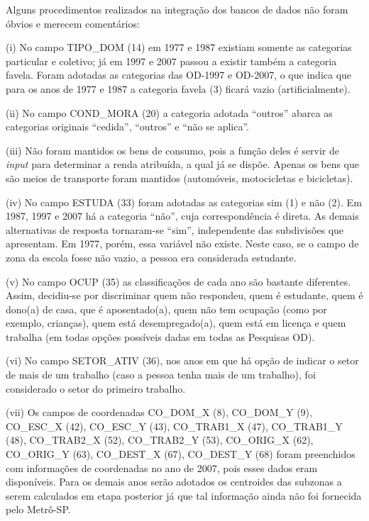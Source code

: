 Alguns procedimentos realizados na integração dos bancos de dados não foram óbvios e merecem comentários:
\begin{compactitem}[]
\item(i) No campo TIPO_DOM (14) em 1977 e 1987 existiam somente as categorias particular e coletivo; já em 1997 e 2007 passou a existir também a categoria favela. Foram adotadas as categorias das OD-1997 e OD-2007, o que indica que para os anos de 1977 e 1987 a categoria favela (3) ficará vazio (artificialmente).
\item(ii) No campo COND_MORA (20) a categoria adotada ``outros'' abarca as categorias originais ``cedida'', ``outros'' e ``não se aplica''.
\item(iii) Não foram mantidos os bens de consumo, pois a função deles é servir de \emph{input} para determinar a renda atribuída, a qual já se dispõe. Apenas os bens que são meios de transporte foram mantidos (automóveis, motocicletas e bicicletas).
\item (iv) No campo ESTUDA (33) foram adotadas as categorias sim (1) e não (2). Em 1987, 1997 e 2007 há a categoria ``não'', cuja correspondência é direta. As demais alternativas de resposta tornaram-se ``sim'', independente das subdivisões que apresentam. Em 1977, porém, essa variável não existe. Neste caso, se o campo de zona da escola fosse não vazio, a pessoa era considerada estudante.
\item (v) No campo OCUP (35) as classificações de cada ano são bastante diferentes. Assim, decidiu-se por discriminar quem não respondeu, quem é estudante, quem é dono(a) de casa, que é aposentado(a), quem não tem ocupação (como por exemplo, crianças), quem está desempregado(a), quem está em licença e quem trabalha (em todas opções possíveis dadas em todas as Pesquisas OD).
\item(vi) No campo SETOR_ATIV (36), nos anos em que há opção de indicar o setor de mais de um trabalho (caso a pessoa tenha mais de um trabalho), foi considerado o setor do primeiro trabalho.
\item(vii) Os campos de coordenadas CO_DOM_X (8), CO_DOM_Y (9), CO_ESC_X (42), CO_ESC_Y (43), CO_TRAB1_X (47), CO_TRAB1_Y (48), CO_TRAB2_X (52), CO_TRAB2_Y (53), CO_ORIG_X (62), CO_ORIG_Y (63), CO_DEST_X (67), CO_DEST_Y (68) foram preenchidos com informações de coordenadas no ano de 2007, pois esses dados eram disponíveis. Para os demais anos serão adotados os centroides das subzonas a serem calculados em etapa posterior já que tal informação ainda não foi fornecida pelo Metrô-SP.

\end{compactitem}
